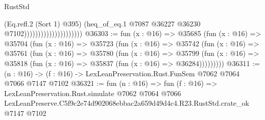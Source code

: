\begin{lexlean}{RustStd}
\begin{coremodule}
                                            (Eq.refl.{2} (Sort 1) @395)
                                            (heq_of_eq.{1}
                                              @7087
                                              @36227
                                              @36230
                                              @7102)))))))))))))))))))))
@36303 := fun (x : @16) =>
  @35685
    (fun (x : @16) =>
    @35704
      (fun (x : @16) =>
      @35723
        (fun (x : @16) =>
        @35742
          (fun (x : @16) =>
          @35761
            (fun (x : @16) =>
            @35780
              (fun (x : @16) =>
              @35799
                (fun (x : @16) => @35818 (fun (x : @16) => @35837 (fun (x : @16) => @36284)))))))))
@36311 := (n : @16) -> (f : @16) -> LexLeanPreservation.Rust.FunSem @7062 @7064 @7066 @7147 @7102
@36321 := fun (n : @16) =>
  fun (f : @16) =>
  LexLeanPreservation.Rust.simulate
    @7062
    @7064
    @7066
    LexLeanPreserve.C5f9c2e74d902068ebbac2a659d49d4c4.R23.RustStd.crate_ok
    @7147
    @7102
\end{coremodule}
\end{lexlean}
